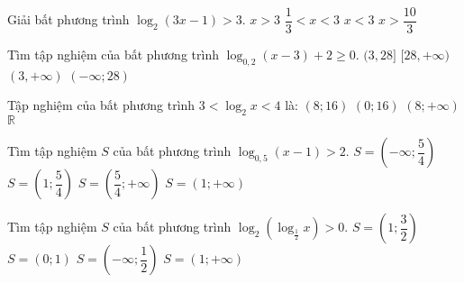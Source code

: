 \begin{ex}%
	Giải bất phương trình $\log_2(3x-1)>3$. 
	\choice
	{\True $x>3$}
	{$\dfrac{1}{3}<x<3$}
	{$x<3$}
	{$x>\dfrac{10}{3}$}
\end{ex}
\begin{ex}%
	Tìm tập nghiệm của bất phương trình $\log_{0,2}(x-3)+2\geq 0$. 
	\choice
	{$(3,28]$}
	{\True $[28,+\infty)$}
	{$(3,+\infty)$}
	{$(-\infty;28)$}
\end{ex}
\begin{ex}%
	Tập nghiệm của bất phương trình $3<\log_2x<4$ là: 
	\choice
	{\True $(8;16)$}
	{$(0;16)$}
	{$(8;+\infty)$}
	{$\mathbb{R}$}
\end{ex}
\begin{ex}%
	Tìm tập nghiệm $S$ của bất phương trình $\log_{0,5}(x-1)>2$. 
	\choice
	{$S=\left(-\infty;\dfrac{5}{4}\right)$}
	{\True $S=\left(1;\dfrac{5}{4}\right)$}
	{$S=\left(\dfrac{5}{4};+\infty\right)$}
	{$S=(1;+\infty)$}
\end{ex}
\begin{ex}%
	Tìm tập nghiệm $S$ của bất phương trình $\log_2\left(\log_{\tfrac{1}{2}}x\right)>0$. 
	\choice
	{\True $S=\left(1;\dfrac{3}{2}\right)$}
	{$S=(0; 1)$}
	{$S=\left(-\infty;\dfrac{1}{2}\right)$}
	{$S=(1;+\infty)$}
\end{ex}
